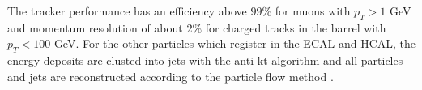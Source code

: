 The tracker performance has an efficiency above $99\%$ for muons with $p_T > 1$ GeV and momentum resolution of about $2\%$ for charged tracks in the barrel with $p_T < 100$ GeV. For the other particles which register in the ECAL and HCAL, the energy deposits are clusted into jets with the anti-kt algorithm \cite{Cacciari:2008gp} and all particles and jets are reconstructed according to the particle flow method \cite{CMS:2017yfk}. \cite{CMS:2008xjf} \cite{CMS:2017lum}




